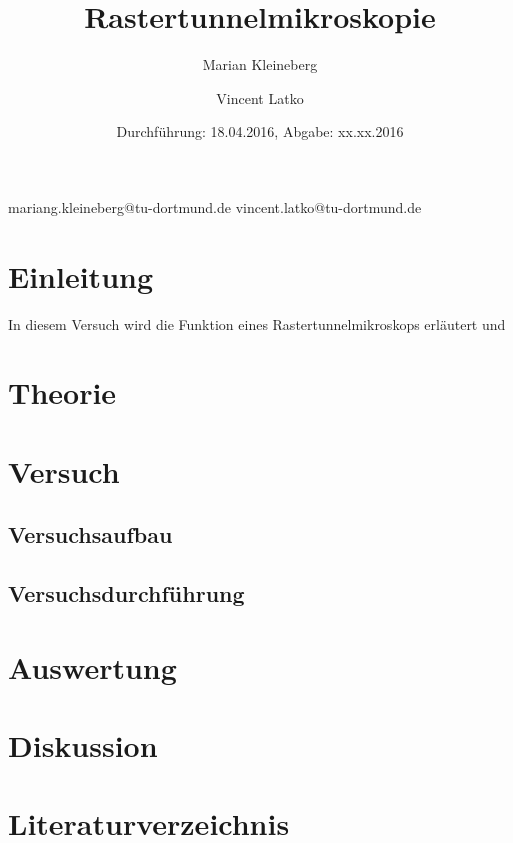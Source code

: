 \documentclass[paper=a4]{scrartcl}
\title{Rastertunnelmikroskopie}
\author{Marian Kleineberg\and Vincent Latko}
\date{Durchführung: 18.04.2016, Abgabe: xx.xx.2016}
\begin{document}
\maketitle
\thispagestyle{empty}
\vfill
mariang.kleineberg@tu-dortmund.de \qquad\qquad\qquad\qquad\qquad\qquad vincent.latko@tu-dortmund.de
\newpage
\tableofcontents
\newpage

\section{Einleitung}
In diesem Versuch wird die Funktion eines Rastertunnelmikroskops erläutert und 
\section{Theorie}
\section{Versuch}
\subsection{Versuchsaufbau}
\subsection{Versuchsdurchführung}
\section{Auswertung}
\section{Diskussion}
\section{Literaturverzeichnis}
\end{document}
